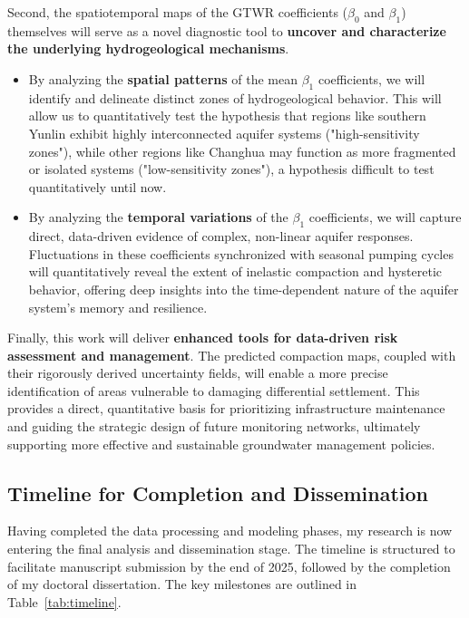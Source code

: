 \documentclass[12pt, a4paper]{article}
\begin{document}
	Second, the spatiotemporal maps of the GTWR coefficients ($\beta_{0}$ and $\beta_{1}$) themselves will serve as a novel diagnostic tool to \textbf{uncover and characterize the underlying hydrogeological mechanisms}. 
	\begin{itemize}
		\item By analyzing the \textbf{spatial patterns} of the mean $\beta_1$ coefficients, we will identify and delineate distinct zones of hydrogeological behavior. This will allow us to quantitatively test the hypothesis that regions like southern Yunlin exhibit highly interconnected aquifer systems ("high-sensitivity zones"), while other regions like Changhua may function as more fragmented or isolated systems ("low-sensitivity zones"), a hypothesis difficult to test quantitatively until now.
		\item By analyzing the \textbf{temporal variations} of the $\beta_1$ coefficients, we will capture direct, data-driven evidence of complex, non-linear aquifer responses. Fluctuations in these coefficients synchronized with seasonal pumping cycles will quantitatively reveal the extent of inelastic compaction and hysteretic behavior, offering deep insights into the time-dependent nature of the aquifer system's memory and resilience.
	\end{itemize}
	
	Finally, this work will deliver \textbf{enhanced tools for data-driven risk assessment and management}. The predicted compaction maps, coupled with their rigorously derived uncertainty fields, will enable a more precise identification of areas vulnerable to damaging differential settlement. This provides a direct, quantitative basis for prioritizing infrastructure maintenance and guiding the strategic design of future monitoring networks, ultimately supporting more effective and sustainable groundwater management policies.
	
	\subsection{Timeline for Completion and Dissemination}
	
	Having completed the data processing and modeling phases, my research is now entering the final analysis and dissemination stage. The timeline is structured to facilitate manuscript submission by the end of 2025, followed by the completion of my doctoral dissertation. The key milestones are outlined in Table~\ref{tab:timeline}.
	
\end{document}

